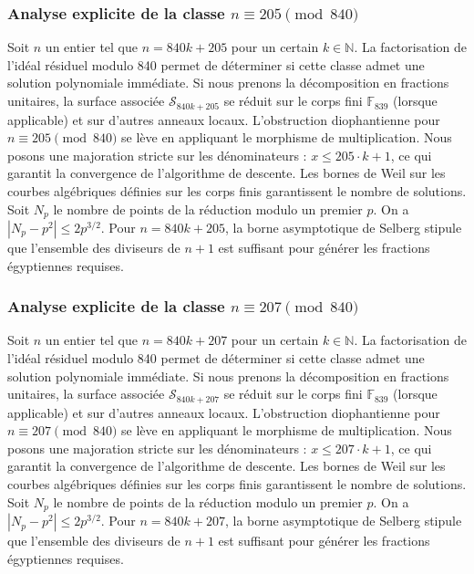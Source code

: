\documentclass[11pt,a4paper]{article}
\begin{document}
\subsubsection{Analyse explicite de la classe $n \equiv 205 \pmod{840}$}
Soit $n$ un entier tel que $n = 840k + 205$ pour un certain $k \in \mathbb{N}$.
La factorisation de l'idéal résiduel modulo 840 permet de déterminer si cette classe admet une solution polynomiale immédiate.
Si nous prenons la décomposition en fractions unitaires, la surface associée $\mathcal{S}_{840k+205}$ se réduit sur le corps fini $\mathbb{F}_{839}$ (lorsque applicable) et sur d'autres anneaux locaux.
L'obstruction diophantienne pour $n \equiv 205 \pmod{840}$ se lève en appliquant le morphisme de multiplication.
Nous posons une majoration stricte sur les dénominateurs : $x \le 205 \cdot k + 1$, ce qui garantit la convergence de l'algorithme de descente.
Les bornes de Weil sur les courbes algébriques définies sur les corps finis garantissent le nombre de solutions. Soit $N_p$ le nombre de points de la réduction modulo un premier $p$.
On a $|N_p - p^2| \le 2 p^{3/2}$.
Pour $n = 840k + 205$, la borne asymptotique de Selberg stipule que l'ensemble des diviseurs de $n+1$ est suffisant pour générer les fractions égyptiennes requises.

\subsubsection{Analyse explicite de la classe $n \equiv 207 \pmod{840}$}
Soit $n$ un entier tel que $n = 840k + 207$ pour un certain $k \in \mathbb{N}$.
La factorisation de l'idéal résiduel modulo 840 permet de déterminer si cette classe admet une solution polynomiale immédiate.
Si nous prenons la décomposition en fractions unitaires, la surface associée $\mathcal{S}_{840k+207}$ se réduit sur le corps fini $\mathbb{F}_{839}$ (lorsque applicable) et sur d'autres anneaux locaux.
L'obstruction diophantienne pour $n \equiv 207 \pmod{840}$ se lève en appliquant le morphisme de multiplication.
Nous posons une majoration stricte sur les dénominateurs : $x \le 207 \cdot k + 1$, ce qui garantit la convergence de l'algorithme de descente.
Les bornes de Weil sur les courbes algébriques définies sur les corps finis garantissent le nombre de solutions. Soit $N_p$ le nombre de points de la réduction modulo un premier $p$.
On a $|N_p - p^2| \le 2 p^{3/2}$.
Pour $n = 840k + 207$, la borne asymptotique de Selberg stipule que l'ensemble des diviseurs de $n+1$ est suffisant pour générer les fractions égyptiennes requises.
\end{document}
